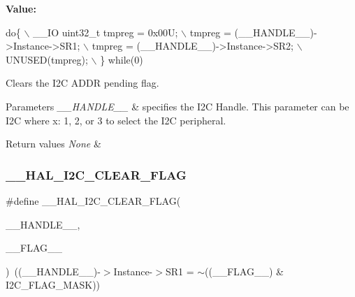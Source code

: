 {\bfseries Value\+:}
\begin{DoxyCode}
\textcolor{keywordflow}{do}\{                                           \(\backslash\)
    \_\_IO uint32\_t tmpreg = 0x00U;               \(\backslash\)
    tmpreg = (\_\_HANDLE\_\_)->Instance->SR1;       \(\backslash\)
    tmpreg = (\_\_HANDLE\_\_)->Instance->SR2;       \(\backslash\)
    UNUSED(tmpreg);                             \(\backslash\)
  \} \textcolor{keywordflow}{while}(0)
\end{DoxyCode}


Clears the I2C A\+D\+DR pending flag. 


\begin{DoxyParams}{Parameters}
{\em \+\_\+\+\_\+\+H\+A\+N\+D\+L\+E\+\_\+\+\_\+} & specifies the I2C Handle. This parameter can be I2C where x\+: 1, 2, or 3 to select the I2C peripheral. \\
\hline
\end{DoxyParams}

\begin{DoxyRetVals}{Return values}
{\em None} & \\
\hline
\end{DoxyRetVals}
\mbox{\label{group___i2_c___exported___macros_ga933e2ea67e86db857a06b70a93be1186}} 
\subsubsection{\texorpdfstring{\+\_\+\+\_\+\+H\+A\+L\+\_\+\+I2\+C\+\_\+\+C\+L\+E\+A\+R\+\_\+\+F\+L\+AG}{\_\_HAL\_I2C\_CLEAR\_FLAG}}
{\footnotesize\ttfamily \#define \+\_\+\+\_\+\+H\+A\+L\+\_\+\+I2\+C\+\_\+\+C\+L\+E\+A\+R\+\_\+\+F\+L\+AG(\begin{DoxyParamCaption}\item[{}]{\+\_\+\+\_\+\+H\+A\+N\+D\+L\+E\+\_\+\+\_\+,  }\item[{}]{\+\_\+\+\_\+\+F\+L\+A\+G\+\_\+\+\_\+ }\end{DoxyParamCaption})~((\+\_\+\+\_\+\+H\+A\+N\+D\+L\+E\+\_\+\+\_\+)-\/$>$Instance-\/$>$S\+R1 = $\sim$((\+\_\+\+\_\+\+F\+L\+A\+G\+\_\+\+\_\+) \& I2\+C\+\_\+\+F\+L\+A\+G\+\_\+\+M\+A\+SK))}



